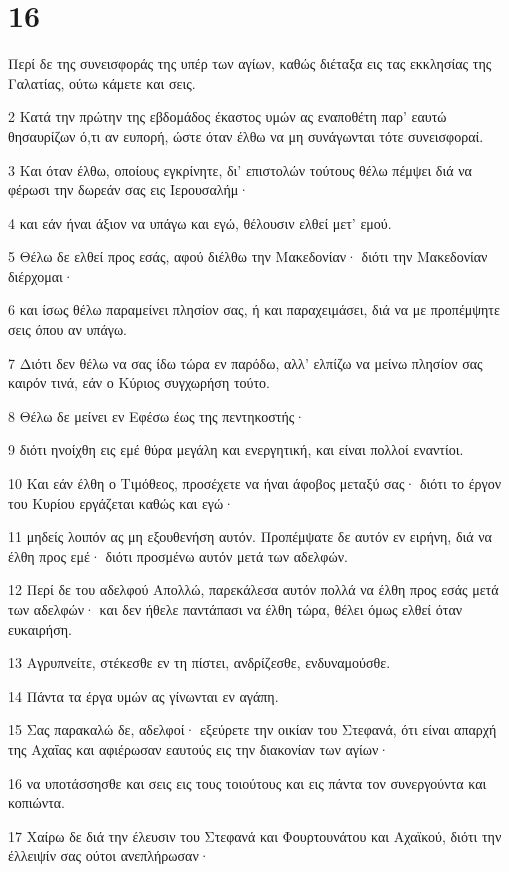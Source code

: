 \chapter{16}

\par Περί δε της συνεισφοράς της υπέρ των αγίων, καθώς διέταξα εις τας εκκλησίας της Γαλατίας, ούτω κάμετε και σεις.
\par 2 Κατά την πρώτην της εβδομάδος έκαστος υμών ας εναποθέτη παρ' εαυτώ θησαυρίζων ό,τι αν ευπορή, ώστε όταν έλθω να μη συνάγωνται τότε συνεισφοραί.
\par 3 Και όταν έλθω, οποίους εγκρίνητε, δι' επιστολών τούτους θέλω πέμψει διά να φέρωσι την δωρεάν σας εις Ιερουσαλήμ·
\par 4 και εάν ήναι άξιον να υπάγω και εγώ, θέλουσιν ελθεί μετ' εμού.
\par 5 Θέλω δε ελθεί προς εσάς, αφού διέλθω την Μακεδονίαν· διότι την Μακεδονίαν διέρχομαι·
\par 6 και ίσως θέλω παραμείνει πλησίον σας, ή και παραχειμάσει, διά να με προπέμψητε σεις όπου αν υπάγω.
\par 7 Διότι δεν θέλω να σας ίδω τώρα εν παρόδω, αλλ' ελπίζω να μείνω πλησίον σας καιρόν τινά, εάν ο Κύριος συγχωρήση τούτο.
\par 8 Θέλω δε μείνει εν Εφέσω έως της πεντηκοστής·
\par 9 διότι ηνοίχθη εις εμέ θύρα μεγάλη και ενεργητική, και είναι πολλοί εναντίοι.
\par 10 Και εάν έλθη ο Τιμόθεος, προσέχετε να ήναι άφοβος μεταξύ σας· διότι το έργον του Κυρίου εργάζεται καθώς και εγώ·
\par 11 μηδείς λοιπόν ας μη εξουθενήση αυτόν. Προπέμψατε δε αυτόν εν ειρήνη, διά να έλθη προς εμέ· διότι προσμένω αυτόν μετά των αδελφών.
\par 12 Περί δε του αδελφού Απολλώ, παρεκάλεσα αυτόν πολλά να έλθη προς εσάς μετά των αδελφών· και δεν ήθελε παντάπασι να έλθη τώρα, θέλει όμως ελθεί όταν ευκαιρήση.
\par 13 Αγρυπνείτε, στέκεσθε εν τη πίστει, ανδρίζεσθε, ενδυναμούσθε.
\par 14 Πάντα τα έργα υμών ας γίνωνται εν αγάπη.
\par 15 Σας παρακαλώ δε, αδελφοί· εξεύρετε την οικίαν του Στεφανά, ότι είναι απαρχή της Αχαΐας και αφιέρωσαν εαυτούς εις την διακονίαν των αγίων·
\par 16 να υποτάσσησθε και σεις εις τους τοιούτους και εις πάντα τον συνεργούντα και κοπιώντα.
\par 17 Χαίρω δε διά την έλευσιν του Στεφανά και Φουρτουνάτου και Αχαϊκού, διότι την έλλειψίν σας ούτοι ανεπλήρωσαν·
